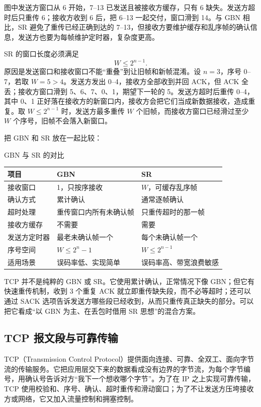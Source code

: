图中发送方窗口从 6 开始，7--13 已发送且被接收方缓存，只有 6 缺失。发送方超时后只重传 6；接收方收到 6 后，把 6--13 一起交付，窗口滑到 14。与 GBN 相比，SR 避免了重传已经正确到达的 7--13，但接收方要维护缓存和乱序帧的确认信息，发送方也要为每帧维护定时器，复杂度更高。

SR 的窗口长度必须满足
\[
W\le 2^{n-1}.
\]
原因是发送窗口和接收窗口不能“重叠”到让旧帧和新帧混淆。设 $n=3$，序号 0--7，若取 $W=5>4$。发送方发出 0--4，接收方全部收到并回 ACK，但 ACK 全丢；接收方窗口滑到 5、6、7、0、1，期望下一轮的 5。发送方超时后重传 0--4，其中 0、1 正好落在接收方的新窗口内，接收方会把它们当成新数据接收，造成重复。取 $W\le 2^{n-1}$ 时，发送方最多重传 $W$ 个旧帧，而接收方窗口已经滑过至少 $W$ 个序号，旧帧不会落入新窗口。

把 GBN 和 SR 放在一起比较：

\begin{tablebox}{GBN 与 SR 的对比}
\centering
\small
\begin{tabularx}{\linewidth}{|p{2.6cm}|X|X|}
\hline
\textbf{项目} & \textbf{GBN} & \textbf{SR} \\
\hline
接收窗口 & 1，只按序接收 & $W$，可缓存乱序帧 \\
确认方式 & 累计确认 & 通常逐帧确认 \\
超时处理 & 重传窗口内所有未确认帧 & 只重传超时的那一帧 \\
接收方缓存 & 不需要 & 需要 \\
发送方定时器 & 最老未确认帧一个 & 每个未确认帧一个 \\
序号空间 & $W\le 2^n-1$ & $W\le 2^{n-1}$ \\
适用场景 & 误码率低、实现简单 & 误码率高、带宽浪费敏感 \\
\hline
\end{tabularx}
\end{tablebox}

TCP 并不是纯粹的 GBN 或 SR。它使用累计确认，正常情况下像 GBN；但它有快速重传机制，收到 3 个重复 ACK 就立即重传缺失段，而不必等超时；还可以通过 SACK 选项告诉发送方哪些段已经收到，从而只重传真正缺失的部分。可以把它看成“以 GBN 为主、在丢包时借用 SR 思想”的混合方案。

\subsection{TCP 报文段与可靠传输}

TCP（Transmission Control Protocol）提供面向连接、可靠、全双工、面向字节流的传输服务。它把应用层交下来的数据看成没有边界的字节流，为每个字节编号，用确认号告诉对方“我下一个想收哪个字节”。为了在 IP 之上实现可靠传输，TCP 使用校验和、序号、确认、超时重传和滑动窗口；为了不让发送方压垮接收方或网络，它又加入流量控制和拥塞控制。

